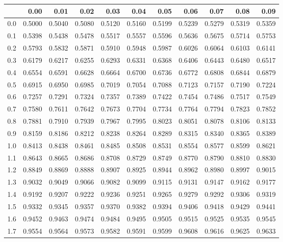 \begin{enumerate}
\begin{longtable}{|r|rrrrrrrrrr|}
  \hline
 & 0.00 & 0.01 & 0.02 & 0.03 & 0.04 & 0.05 & 0.06 & 0.07 & 0.08 & 0.09 \\ 
  \hline
0.0 & 0.5000 & 0.5040 & 0.5080 & 0.5120 & 0.5160 & 0.5199 & 0.5239 & 0.5279 & 0.5319 & 0.5359 \\ 
  0.1 & 0.5398 & 0.5438 & 0.5478 & 0.5517 & 0.5557 & 0.5596 & 0.5636 & 0.5675 & 0.5714 & 0.5753 \\ 
  0.2 & 0.5793 & 0.5832 & 0.5871 & 0.5910 & 0.5948 & 0.5987 & 0.6026 & 0.6064 & 0.6103 & 0.6141 \\ 
  0.3 & 0.6179 & 0.6217 & 0.6255 & 0.6293 & 0.6331 & 0.6368 & 0.6406 & 0.6443 & 0.6480 & 0.6517 \\ 
  0.4 & 0.6554 & 0.6591 & 0.6628 & 0.6664 & 0.6700 & 0.6736 & 0.6772 & 0.6808 & 0.6844 & 0.6879 \\ 
  0.5 & 0.6915 & 0.6950 & 0.6985 & 0.7019 & 0.7054 & 0.7088 & 0.7123 & 0.7157 & 0.7190 & 0.7224 \\ 
  0.6 & 0.7257 & 0.7291 & 0.7324 & 0.7357 & 0.7389 & 0.7422 & 0.7454 & 0.7486 & 0.7517 & 0.7549 \\ 
  0.7 & 0.7580 & 0.7611 & 0.7642 & 0.7673 & 0.7704 & 0.7734 & 0.7764 & 0.7794 & 0.7823 & 0.7852 \\ 
  0.8 & 0.7881 & 0.7910 & 0.7939 & 0.7967 & 0.7995 & 0.8023 & 0.8051 & 0.8078 & 0.8106 & 0.8133 \\ 
  0.9 & 0.8159 & 0.8186 & 0.8212 & 0.8238 & 0.8264 & 0.8289 & 0.8315 & 0.8340 & 0.8365 & 0.8389 \\ 
  1.0 & 0.8413 & 0.8438 & 0.8461 & 0.8485 & 0.8508 & 0.8531 & 0.8554 & 0.8577 & 0.8599 & 0.8621 \\ 
  1.1 & 0.8643 & 0.8665 & 0.8686 & 0.8708 & 0.8729 & 0.8749 & 0.8770 & 0.8790 & 0.8810 & 0.8830 \\ 
  1.2 & 0.8849 & 0.8869 & 0.8888 & 0.8907 & 0.8925 & 0.8944 & 0.8962 & 0.8980 & 0.8997 & 0.9015 \\ 
  1.3 & 0.9032 & 0.9049 & 0.9066 & 0.9082 & 0.9099 & 0.9115 & 0.9131 & 0.9147 & 0.9162 & 0.9177 \\ 
  1.4 & 0.9192 & 0.9207 & 0.9222 & 0.9236 & 0.9251 & 0.9265 & 0.9279 & 0.9292 & 0.9306 & 0.9319 \\ 
  1.5 & 0.9332 & 0.9345 & 0.9357 & 0.9370 & 0.9382 & 0.9394 & 0.9406 & 0.9418 & 0.9429 & 0.9441 \\ 
  1.6 & 0.9452 & 0.9463 & 0.9474 & 0.9484 & 0.9495 & 0.9505 & 0.9515 & 0.9525 & 0.9535 & 0.9545 \\ 
  1.7 & 0.9554 & 0.9564 & 0.9573 & 0.9582 & 0.9591 & 0.9599 & 0.9608 & 0.9616 & 0.9625 & 0.9633 \\ 

\end{longtable}
\end{enumerate}
